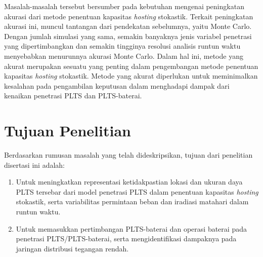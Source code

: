 
Masalah-masalah tersebut bersumber pada kebutuhan mengenai peningkatan akurasi dari metode penentuan kapasitas \textit{hosting} stokastik. Terkait peningkatan akurasi ini, muncul tantangan dari pendekatan sebelumnya, yaitu Monte Carlo. Dengan jumlah simulasi yang sama, semakin banyaknya jenis variabel penetrasi yang dipertimbangkan dan semakin tingginya resolusi analisis runtun waktu menyebabkan menurunnya akurasi Monte Carlo. Dalam hal ini, metode yang akurat merupakan sesuatu yang penting dalam pengembangan metode penentuan kapasitas \textit{hosting} stokastik. Metode yang akurat diperlukan untuk meminimalkan kesalahan pada pengambilan keputusan dalam menghadapi dampak dari kenaikan penetrasi PLTS dan PLTS-baterai.

\section{Tujuan Penelitian}
Berdasarkan rumusan masalah yang telah dideskripsikan, tujuan dari penelitian disertasi ini adalah:
\begin{enumerate}
    \item Untuk meningkatkan representasi ketidakpastian lokasi dan ukuran daya PLTS tersebar dari model penetrasi PLTS dalam penentuan kapasitas \textit{hosting} stokastik, serta variabilitas permintaan beban dan iradiasi matahari dalam runtun waktu.
    \item Untuk memasukkan pertimbangan PLTS-baterai dan operasi baterai pada penetrasi PLTS/PLTS-baterai, serta mengidentifikasi dampaknya pada jaringan distribusi tegangan rendah.
\end{enumerate}

